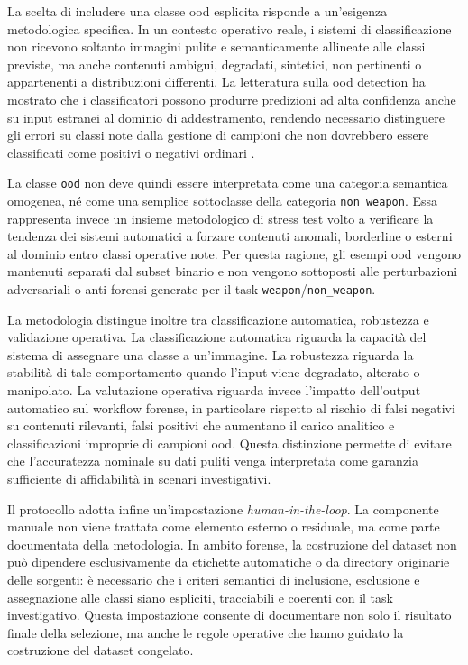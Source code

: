 La scelta di includere una classe \gls{ood} esplicita risponde a un'esigenza
metodologica specifica. In un contesto operativo reale, i sistemi di
classificazione non ricevono soltanto immagini pulite e semanticamente allineate
alle classi previste, ma anche contenuti ambigui, degradati, sintetici, non
pertinenti o appartenenti a distribuzioni differenti. La letteratura sulla
\gls{ood} detection ha mostrato che i classificatori possono produrre predizioni
ad alta confidenza anche su input estranei al dominio di addestramento,
rendendo necessario distinguere gli errori su classi note dalla gestione di
campioni che non dovrebbero essere classificati come positivi o negativi
ordinari \cite{hendrycks2017baseline,fort2021exploring}.

La classe \texttt{ood} non deve quindi essere interpretata come una categoria
semantica omogenea, né come una semplice sottoclasse della categoria
\texttt{non\_weapon}. Essa rappresenta invece un insieme metodologico di stress
test volto a verificare la tendenza dei sistemi automatici a forzare contenuti
anomali, borderline o esterni al dominio entro classi operative note. Per questa
ragione, gli esempi \gls{ood} vengono mantenuti separati dal subset binario e
non vengono sottoposti alle perturbazioni adversariali o anti-forensi generate
per il task \texttt{weapon}/\texttt{non\_weapon}.

La metodologia distingue inoltre tra classificazione automatica, robustezza e
validazione operativa. La classificazione automatica riguarda la capacità del
sistema di assegnare una classe a un'immagine. La robustezza riguarda la
stabilità di tale comportamento quando l'input viene degradato, alterato o
manipolato. La valutazione operativa riguarda invece l'impatto dell'output
automatico sul workflow forense, in particolare rispetto al rischio di falsi
negativi su contenuti rilevanti, falsi positivi che aumentano il carico
analitico e classificazioni improprie di campioni \gls{ood}. Questa distinzione
permette di evitare che l'accuratezza nominale su dati puliti venga interpretata
come garanzia sufficiente di affidabilità in scenari investigativi.

Il protocollo adotta infine un'impostazione \textit{human-in-the-loop}. La
componente manuale non viene trattata come elemento esterno o residuale, ma come
parte documentata della metodologia. In ambito forense, la costruzione del
dataset non può dipendere esclusivamente da etichette automatiche o da directory
originarie delle sorgenti: è necessario che i criteri semantici di inclusione,
esclusione e assegnazione alle classi siano espliciti, tracciabili e coerenti
con il task investigativo. Questa impostazione consente di documentare non solo
il risultato finale della selezione, ma anche le regole operative che hanno
guidato la costruzione del dataset congelato.


